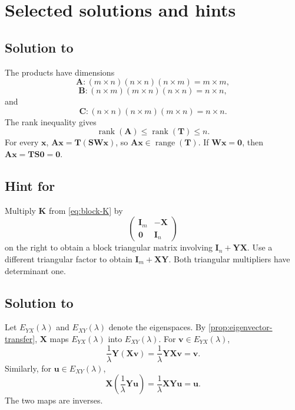 \documentclass[11pt]{article}
\newcommand{\I}{\mathbf{I}}
\newcommand{\mat}[1]{\mathbf{#1}}
\newcommand{\vect}[1]{\mathbf{#1}}
\newcommand{\rank}{\operatorname{rank}}
\newcommand{\range}{\operatorname{range}}
\theoremstyle{definition}
\theoremstyle{remark}
\begin{document}
\section{Selected solutions and hints}
\label{app:solutions}

\subsection*{Solution to }

The products have dimensions
\[
  \mat{A}: (m\times n)(n\times n)(n\times m)=m\times m,
\]
\[
  \mat{B}: (n\times m)(m\times n)(n\times n)=n\times n,
\]
and
\[
  \mat{C}: (n\times n)(n\times m)(m\times n)=n\times n.
\]
The rank inequality gives
\[
  \rank(\mat{A})
  \leq\rank(\mat{T})
  \leq n.
\]
For every \(\vect{x}\),
\(\mat{A}\vect{x}=\mat{T}(\mat{S}\mat{W}\vect{x})\), so
\(\mat{A}\vect{x}\in\range(\mat{T})\). If \(\mat{W}\vect{x}=\vect{0}\), then
\(\mat{A}\vect{x}=\mat{T}\mat{S}\vect{0}=\vect{0}\).

\subsection*{Hint for }

Multiply \(\mat{K}\) from \cref{eq:block-K} by
\[
  \begin{pmatrix}
    \I_m&-\mat{X}\\
    \mat{0}&\I_n
  \end{pmatrix}
\]
on the right to obtain a block triangular matrix involving
\(\I_n+\mat{Y}\mat{X}\). Use a different triangular factor to obtain
\(\I_m+\mat{X}\mat{Y}\). Both triangular multipliers have determinant one.

\subsection*{Solution to }

Let \(E_{YX}(\lambda)\) and \(E_{XY}(\lambda)\) denote the eigenspaces. By
\cref{prop:eigenvector-transfer}, \(\mat{X}\) maps
\(E_{YX}(\lambda)\) into \(E_{XY}(\lambda)\). For
\(\vect{v}\in E_{YX}(\lambda)\),
\[
  \frac{1}{\lambda}\mat{Y}(\mat{X}\vect{v})
  =\frac{1}{\lambda}\mat{Y}\mat{X}\vect{v}
  =\vect{v}.
\]
Similarly, for \(\vect{u}\in E_{XY}(\lambda)\),
\[
  \mat{X}\left(\frac{1}{\lambda}\mat{Y}\vect{u}\right)
  =\frac{1}{\lambda}\mat{X}\mat{Y}\vect{u}
  =\vect{u}.
\]
The two maps are inverses.
\end{document}

